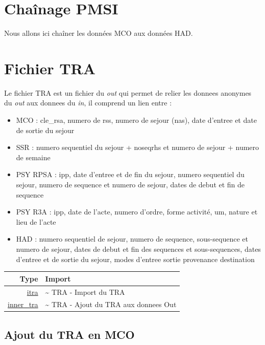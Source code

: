 \documentclass[]{book}
\providecommand{\tightlist}{%
  \setlength{\itemsep}{0pt}\setlength{\parskip}{0pt}}
\begin{document}
\chapter{Chaînage PMSI}\label{chainage-pmsi}

Nous allons ici chaîner les données MCO aux données HAD.

\chapter{Fichier TRA}\label{fichier-tra}

Le fichier TRA est un fichier du \emph{out} qui permet de relier les
donnees anonymes du \emph{out} aux donnees du \emph{in}, il comprend un
lien entre :

\begin{itemize}
\tightlist
\item
  MCO : cle\_rsa, numero de rss, numero de sejour (nas), date d'entree
  et date de sortie du sejour
\item
  SSR : numero sequentiel du sejour + noseqrhs et numero de sejour +
  numero de semaine
\item
  PSY RPSA : ipp, date d'entree et de fin du sejour, numero sequentiel
  du sejour, numero de sequence et numero de sejour, dates de debut et
  fin de sequence
\item
  PSY R3A : ipp, date de l'acte, numero d'ordre, forme activité, um,
  nature et lieu de l'acte
\item
  HAD : numero sequentiel de sejour, numero de sequence, sous-sequence
  et numero de sejour, dates de debut et fin des sequences et
  sous-sequences, dates d'entree et de sortie du sejour, modes d'entree
  sortie provenance destination
\end{itemize}

\begin{longtable}[]{@{}rl@{}}
\toprule
Type & Import\tabularnewline
\midrule
\endhead
\href{https://github.com/IM-APHP/pmeasyr/tree/master/Rd_md/itra.Rmd}{itra}
& \textasciitilde{} TRA - Import du TRA\tabularnewline
\href{https://github.com/IM-APHP/pmeasyr/tree/master/Rd_md/inner_tra.Rmd}{inner\_tra}
& \textasciitilde{} TRA - Ajout du TRA aux donnees Out\tabularnewline
\bottomrule
\end{longtable}

\section{Ajout du TRA en MCO}\label{ajout-du-tra-en-mco}
\end{document}
